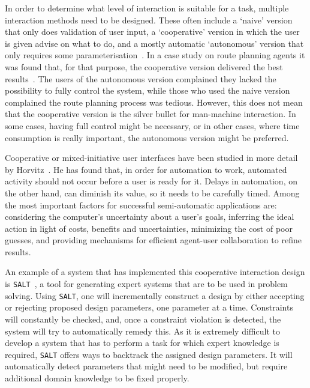 In order to determine what level of interaction is suitable for a task, multiple interaction methods need to be designed. These often include a `naive' version that only does validation of user input, a `cooperative' version in which the user is given advise on what to do, and a mostly automatic `autonomous' version that only requires some parameterisation~\cite{payne2000varying,horvitz1999principles}. In a case study on route planning agents it was found that, for that purpose, the cooperative version delivered the best results~\cite{payne2000varying}. The users of the autonomous version complained they lacked the possibility to fully control the system, while those who used the naive version complained the route planning process was tedious. However, this does not mean that the cooperative version is the silver bullet for man-machine interaction. In some cases, having full control might be necessary, or in other cases, where time consumption is really important, the autonomous version might be preferred.

Cooperative or mixed-initiative user interfaces have been studied in more detail by Horvitz~\cite{horvitz1999principles}. He has found that, in order for automation to work, automated activity should not occur before a user is ready for it. Delays in automation, on the other hand, can diminish its value, so it needs to be carefully timed. Among the most important factors for successful semi-automatic applications are: considering the computer's uncertainty about a user's goals, inferring the ideal action in light of costs, benefits and uncertainties, minimizing the cost of poor guesses, and providing mechanisms for efficient agent-user collaboration to refine results.

An example of a system that has implemented this cooperative interaction design is \verb|SALT|~\cite{marcus1987taking}, a tool for generating expert systems that are to be used in problem solving. Using \verb|SALT|, one will incrementally construct a design by either accepting or rejecting proposed design parameters, one parameter at a time. Constraints will constantly be checked, and, once a constraint violation is detected, the system will try to automatically remedy this. As it is extremely difficult to develop a system that has to perform a task for which expert knowledge is required, \verb|SALT| offers ways to backtrack the assigned design parameters. It will automatically detect parameters that might need to be modified, but require additional domain knowledge to be fixed properly.

